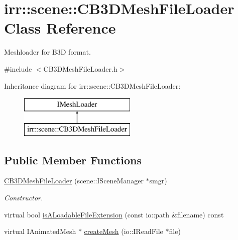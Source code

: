 \hypertarget{classirr_1_1scene_1_1_c_b3_d_mesh_file_loader}{\section{irr\-:\-:scene\-:\-:C\-B3\-D\-Mesh\-File\-Loader Class Reference}
\label{classirr_1_1scene_1_1_c_b3_d_mesh_file_loader}
}


Meshloader for B3\-D format.  




{\ttfamily \#include $<$C\-B3\-D\-Mesh\-File\-Loader.\-h$>$}

Inheritance diagram for irr\-:\-:scene\-:\-:C\-B3\-D\-Mesh\-File\-Loader\-:\begin{figure}[H]
\begin{center}
\leavevmode
\includegraphics[height=2.000000cm]{classirr_1_1scene_1_1_c_b3_d_mesh_file_loader}
\end{center}
\end{figure}
\subsection*{Public Member Functions}
\begin{DoxyCompactItemize}
\item 
\hypertarget{classirr_1_1scene_1_1_c_b3_d_mesh_file_loader_a9111d1f89e94ce6e36b34456bdc4120c}{\hyperlink{classirr_1_1scene_1_1_c_b3_d_mesh_file_loader_a9111d1f89e94ce6e36b34456bdc4120c}{C\-B3\-D\-Mesh\-File\-Loader} (scene\-::\-I\-Scene\-Manager $\ast$smgr)}\label{classirr_1_1scene_1_1_c_b3_d_mesh_file_loader_a9111d1f89e94ce6e36b34456bdc4120c}

\begin{DoxyCompactList}\small\item\em Constructor. \end{DoxyCompactList}\item 
virtual bool \hyperlink{classirr_1_1scene_1_1_c_b3_d_mesh_file_loader_a8c1e323826ad9062c6fb41a4cec85999}{is\-A\-Loadable\-File\-Extension} (const io\-::path \&filename) const 
\item 
virtual I\-Animated\-Mesh $\ast$ \hyperlink{classirr_1_1scene_1_1_c_b3_d_mesh_file_loader_a20cb6345fa21eeb9972406e7a8d04ab6}{create\-Mesh} (io\-::\-I\-Read\-File $\ast$file)
\end{DoxyCompactItemize}


